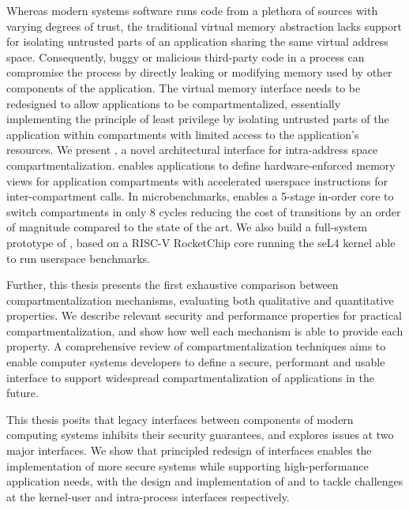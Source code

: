 Whereas modern systems software runs code from a plethora of sources with
varying degrees of trust, the traditional virtual memory abstraction lacks
support for isolating untrusted parts of an application sharing the same 
virtual address space.
Consequently, buggy or malicious third-party code in a process can compromise
the process by directly leaking or modifying memory used by other components 
of the application.
The virtual memory interface needs to be redesigned to allow applications to
be compartmentalized, essentially implementing the principle of least privilege
by isolating untrusted parts of the application within compartments with 
limited access to the application's resources.
We present \seccells, a novel architectural interface for intra-address space
compartmentalization.
\seccells enables applications to define hardware-enforced memory views for 
application compartments with 
accelerated userspace instructions for inter-compartment calls.
In microbenchmarks, \seccells enables a 5-stage in-order core to switch 
compartments in only 8 cycles reducing the cost of transitions by an order
of magnitude compared to the state of the art.
We also build a full-system prototype of \seccells, based on a RISC-V 
RocketChip core running the seL4 kernel able to run userspace benchmarks.

Further, this thesis presents the first exhaustive comparison between 
compartmentalization mechanisms, evaluating both qualitative and quantitative
properties.
We describe relevant security and performance properties for practical
compartmentalization, and show how well each mechanism is able to provide each
property.
A comprehensive review of compartmentalization techniques aims to enable
computer systems developers to define a secure, performant and usable interface
to support widespread compartmentalization of applications in the future.

This thesis posits that legacy interfaces between components of modern
computing systems inhibits their security guarantees, and explores issues
at two major interfaces.
We show that principled redesign of interfaces enables the implementation of
more secure systems while supporting high-performance application needs,
with the design and implementation of \midas and \seccells to tackle challenges
at the kernel-user and intra-process interfaces respectively.

